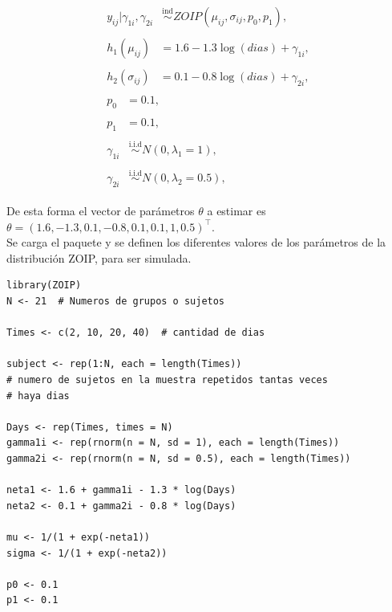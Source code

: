 \begin{align*}
\begin{split}
y_{ij}| \gamma_{1i},\gamma_{2i} & \overset{\text{ind}}{\sim} ZOIP(\mu_{ij},\sigma_{ij},p_{0}, p_{1}),
\end{split}\\
\begin{split}
	h_1(\mu_{ij}) &= 1.6-1.3 \log(dias) + \gamma_{1i},
\end{split}\\
\begin{split}
	h_2(\sigma_{ij}) &= 0.1-0.8\log(dias) + \gamma_{2i},
\end{split}\\
\begin{split}
	p_{0} &= 0.1,
\end{split}\\
\begin{split}
	p_{1} &= 0.1,
\end{split}\\
\begin{split}
	\gamma_{1i} & \overset{\text{i.i.d}}{\sim}  N(0,\lambda_1=1),
\end{split}\\
\begin{split}
	\gamma_{2i} & \overset{\text{i.i.d}}{\sim}  N(0,\lambda_2=0.5),
\end{split}
\end{align*}

De esta forma el vector de par\'{a}metros $\theta$ a estimar es $\theta=(1.6, -1.3, 0.1, -0.8, 0.1, 0.1, 1, 0.5)^{\top}$.\\

Se carga el paquete  y se definen los diferentes valores de los par\'{a}metros de la distribuci\'{o}n ZOIP, para ser simulada.


\begin{verbatim}
library(ZOIP)
N <- 21  # Numeros de grupos o sujetos

Times <- c(2, 10, 20, 40)  # cantidad de dias

subject <- rep(1:N, each = length(Times))
# numero de sujetos en la muestra repetidos tantas veces
# haya dias

Days <- rep(Times, times = N)
gamma1i <- rep(rnorm(n = N, sd = 1), each = length(Times))
gamma2i <- rep(rnorm(n = N, sd = 0.5), each = length(Times))

neta1 <- 1.6 + gamma1i - 1.3 * log(Days)
neta2 <- 0.1 + gamma2i - 0.8 * log(Days)

mu <- 1/(1 + exp(-neta1))
sigma <- 1/(1 + exp(-neta2))

p0 <- 0.1
p1 <- 0.1
\end{verbatim}

